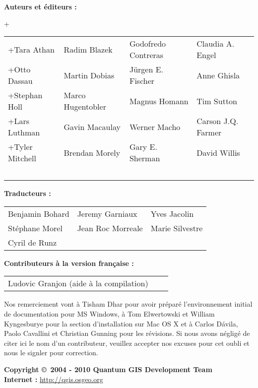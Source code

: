 \newpage

\begin{flushleft}
\textbf{Auteurs et éditeurs :}
 
+\begin{tabular}{p{4cm} p{4cm} p{4cm} p{4cm}}
+Tara Athan & Radim Blazek & Godofredo Contreras & Claudia A. Engel \\
+Otto Dassau & Martin Dobias & J\"urgen E. Fischer & Anne Ghisla \\ 
+Stephan Holl & Marco Hugentobler & Magnus Homann & Tim Sutton \\ 
+Lars Luthman & Gavin Macaulay & Werner Macho & Carson J.Q. Farmer \\
+Tyler Mitchell & Brendan Morely & Gary E. Sherman & David Willis \\ \
\end{tabular}
\end{flushleft}

\begin{flushleft}
\textbf{Traducteurs :}
 
\begin{tabular}{p{5cm} p{5cm} p{5cm}}
Benjamin Bohard & Jeremy Garniaux & Yves Jacolin \\
Stéphane Morel & Jean Roc Morreale & Marie Silvestre \\
Cyril de Runz \\
\end{tabular}
\end{flushleft}

\begin{flushleft}
\textbf{Contributeurs à la version française :}

\begin{tabular}{p{5cm} p{5cm} p{5cm}}
Ludovic Granjon (aide à la compilation) \\
\end{tabular}
\vspace{1cm}

Nos remerciement vont à Tisham Dhar pour avoir préparé l'environnement initial de documentation pour MS Windows, à Tom Elwertowski et William Kyngesburye pour la section d'installation sur Mac OS X et à Carlos  D\'{a}vila, Paolo Cavallini et Christian Gunning pour les révisions. Si nous avons négligé de citer ici le nom d'un contributeur, veuillez accepter nos excuses pour cet oubli et nous le signler pour correction.

\textbf{Copyright \copyright~2004 - 2010 Quantum GIS Development Team} \\
\textbf{Internet :} \url{http://qgis.osgeo.org}
\end{flushleft}
